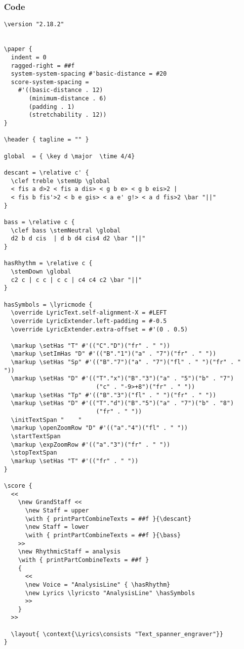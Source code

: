 \documentclass[
  DIV=calc,
  BCOR=5mm,
  12pt,
  headings=small,
  oneside,
  abstract=true,
  toc=bib,
  xcolor=dvipsnames,
  openany,
  ngerman,english]{scrartcl}
\begin{document}
\subsubsection{Code}
\begin{scriptsize}
\begin{verbatim}
\version "2.18.2"


\paper {
  indent = 0
  ragged-right = ##f
  system-system-spacing #'basic-distance = #20
  score-system-spacing =
    #'((basic-distance . 12)
       (minimum-distance . 6)
       (padding . 1)
       (stretchability . 12))
}

\header { tagline = "" }

global  = { \key d \major  \time 4/4}

descant = \relative c' {
  \clef treble \stemUp \global
  < fis a d>2 < fis a dis> < g b e> < g b eis>2 | 
  < fis b fis'>2 < b e gis> < a e' g!> < a d fis>2 \bar "||"
}

bass = \relative c {
  \clef bass \stemNeutral \global
  d2 b d cis  | d b d4 cis4 d2 \bar "||"
}

hasRhythm = \relative c {
  \stemDown \global
  c2 c | c c | c c | c4 c4 c2 \bar "||"
}

hasSymbols = \lyricmode {
  \override LyricText.self-alignment-X = #LEFT
  \override LyricExtender.left-padding = #-0.5
  \override LyricExtender.extra-offset = #'(0 . 0.5)

  \markup \setHas "T" #'(("C"."D")("fr" . " "))
  \markup \setImHas "D" #'(("B"."1")("a" . "7")("fr" . " "))
  \markup \setHas "Sp" #'(("B"."7")("a" . "7")("fl" . " ")("fr" . " "))
  \markup \setHas "D" #'(("T"."x")("B"."3")("a" . "5")("b" . "7")
                          ("c" . "-9>+8")("fr" . " "))
  \markup \setHas "Tp" #'(("B"."3")("fl" . " ")("fr" . " ")) 
  \markup \setHas "D" #'(("T"."d")("B"."5")("a" . "7")("b" . "8")
                          ("fr" . " "))    
  \initTextSpan "    "
  \markup \openZoomRow "D" #'(("a"."4")("fl" . " "))
  \startTextSpan
  \markup \expZoomRow #'(("a"."3")("fr" . " ")) 
  \stopTextSpan
  \markup \setHas "T" #'(("fr" . " "))
}

\score {
  <<
    \new GrandStaff <<
      \new Staff = upper
      \with { printPartCombineTexts = ##f }{\descant}
      \new Staff = lower
      \with { printPartCombineTexts = ##f }{\bass}
    >>
    \new RhythmicStaff = analysis
    \with { printPartCombineTexts = ##f }
    {
      << 
      \new Voice = "AnalysisLine" { \hasRhythm}
      \new Lyrics \lyricsto "AnalysisLine" \hasSymbols
      >>
    }
  >>

  \layout{ \context{\Lyrics\consists "Text_spanner_engraver"}}
} 

\end{verbatim}
\end{scriptsize}
\end{document}
